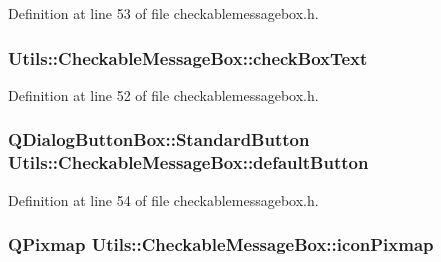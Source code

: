 \-Definition at line 53 of file checkablemessagebox.\-h.

\hypertarget{class_utils_1_1_checkable_message_box_a47682e1634b9d1806e19abc75a3d13dc}{
\subsubsection[{check\-Box\-Text}]{ {\bf \-Utils\-::\-Checkable\-Message\-Box\-::check\-Box\-Text}}}\label{class_utils_1_1_checkable_message_box_a47682e1634b9d1806e19abc75a3d13dc}


\-Definition at line 52 of file checkablemessagebox.\-h.

\hypertarget{class_utils_1_1_checkable_message_box_ab3ac6c8016a1f22d503293af7434db0f}{
\subsubsection[{default\-Button}]{\setlength{\rightskip}{0pt plus 5cm}\-Q\-Dialog\-Button\-Box\-::\-Standard\-Button {\bf \-Utils\-::\-Checkable\-Message\-Box\-::default\-Button}}}\label{class_utils_1_1_checkable_message_box_ab3ac6c8016a1f22d503293af7434db0f}


\-Definition at line 54 of file checkablemessagebox.\-h.

\hypertarget{class_utils_1_1_checkable_message_box_aee6ca7e2633372c9938d00a307ff2dc7}{
\subsubsection[{icon\-Pixmap}]{\setlength{\rightskip}{0pt plus 5cm}\-Q\-Pixmap {\bf \-Utils\-::\-Checkable\-Message\-Box\-::icon\-Pixmap}}}\label{class_utils_1_1_checkable_message_box_aee6ca7e2633372c9938d00a307ff2dc7}


